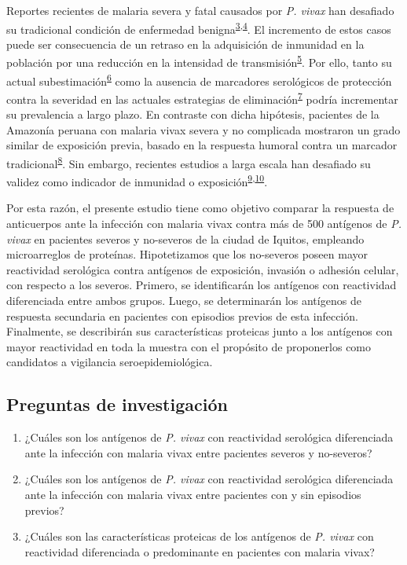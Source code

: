 \documentclass[]{article}
\begin{document}
Reportes recientes de malaria severa y fatal causados por \emph{P.
vivax} han desafiado su tradicional condición de enfermedad
benigna\textsuperscript{\protect\hyperlink{ref-baird2009}{3},\protect\hyperlink{ref-quispe2014}{4}}.
El incremento de estos casos puede ser consecuencia de un retraso en la
adquisición de inmunidad en la población por una reducción en la
intensidad de
transmisión\textsuperscript{\protect\hyperlink{ref-reyburn2015}{5}}. Por
ello, tanto su actual
subestimación\textsuperscript{\protect\hyperlink{ref-norma2001}{6}} como
la ausencia de marcadores serológicos de protección contra la severidad
en las actuales estrategias de
eliminación\textsuperscript{\protect\hyperlink{ref-accelerate2016}{7}}
podría incrementar su prevalencia a largo plazo. En contraste con dicha
hipótesis, pacientes de la Amazonía peruana con malaria vivax severa y
no complicada mostraron un grado similar de exposición previa, basado en
la respuesta humoral contra un marcador
tradicional\textsuperscript{\protect\hyperlink{ref-baldevi2013}{8}}. Sin
embargo, recientes estudios a larga escala han desafiado su validez como
indicador de inmunidad o
exposición\textsuperscript{\protect\hyperlink{ref-crompton2010}{9},\protect\hyperlink{ref-Helb2015exposure}{10}}.

Por esta razón, el presente estudio tiene como objetivo comparar la
respuesta de anticuerpos ante la infección con malaria vivax contra más
de 500 antígenos de \emph{P. vivax} en pacientes severos y no-severos de
la ciudad de Iquitos, empleando microarreglos de proteínas.
Hipotetizamos que los no-severos poseen mayor reactividad serológica
contra antígenos de exposición, invasión o adhesión celular, con
respecto a los severos. Primero, se identificarán los antígenos con
reactividad diferenciada entre ambos grupos. Luego, se determinarán los
antígenos de respuesta secundaria en pacientes con episodios previos de
esta infección. Finalmente, se describirán sus características proteicas
junto a los antígenos con mayor reactividad en toda la muestra con el
propósito de proponerlos como candidatos a vigilancia
seroepidemiológica.

\subsection{Preguntas de
investigación}\label{preguntas-de-investigacion}

\begin{enumerate}
\def\labelenumi{\arabic{enumi}.}
\item
  ¿Cuáles son los antígenos de \emph{P. vivax} con reactividad
  serológica diferenciada ante la infección con malaria vivax entre
  pacientes severos y no-severos?
\item
  ¿Cuáles son los antígenos de \emph{P. vivax} con reactividad
  serológica diferenciada ante la infección con malaria vivax entre
  pacientes con y sin episodios previos?
\item
  ¿Cuáles son las características proteicas de los antígenos de \emph{P.
  vivax} con reactividad diferenciada o predominante en pacientes con
  malaria vivax?
\end{enumerate}
\end{document}
